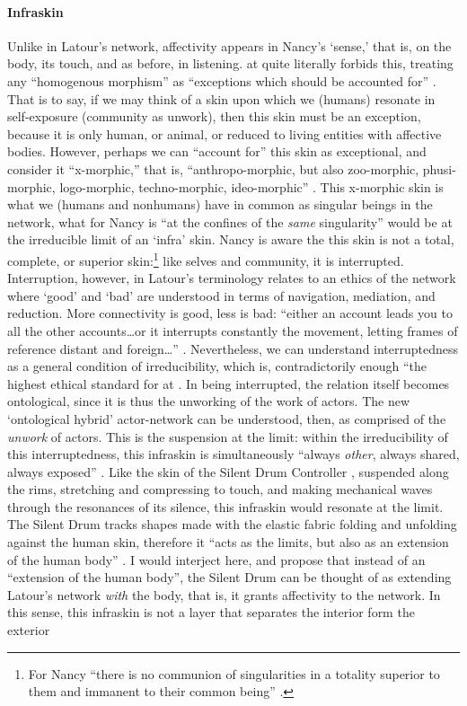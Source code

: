 \paragraph{Infraskin}
Unlike in Latour's network, affectivity appears in Nancy's `sense,' that is, on the body, its touch, and as before, in listening. \gls{at} quite literally forbids this, treating any ``homogenous morphism'' as ``exceptions which should be accounted for'' \parencite[16]{Lat90:On}. That is to say, if we may think of a skin upon which we (humans) resonate in self-exposure (community as unwork), then this skin must be an exception, because it is only human, or animal, or reduced to living entities with affective bodies. However, perhaps we can ``account for'' this skin as exceptional, and consider it ``x-morphic,'' that is, ``anthropo-morphic, but also zoo-morphic, phusi-morphic, logo-morphic, techno-morphic, ideo-morphic'' \parencite[16]{Lat90:On}. This x-morphic skin is what we (humans and nonhumans) have in common as singular beings in the network, what for Nancy is ``at the confines of the \textit{same} singularity'' \parencite[28]{Nan91:The} would be at the irreducible limit of an `infra' skin. Nancy is aware the this skin is not a total, complete, or superior skin:\footnote{For Nancy ``there is no communion of singularities in a totality superior to them and immanent to their common being'' \parencite[28]{Nan91:The}.} like selves and community, it is interrupted. Interruption, however, in Latour's terminology relates to an ethics of the network where `good' and `bad' are understood in terms of navigation, mediation, and reduction. More connectivity is good, less is bad: ``either an account leads you to all the other accounts\dots or it interrupts constantly the movement, letting frames of reference distant and foreign\dots'' \parencite[13-14]{Lat90:On}. Nevertheless, we can understand interruptedness as a general condition of irreducibility, which is, contradictorily enough ``the highest ethical standard for \gls{at} \parencite[14]{Lat90:On}. In being interrupted, the relation itself becomes ontological, since it is thus the unworking of the work of actors. The new `ontological hybrid' actor-network can be understood, then, as comprised of the \textit{unwork} of actors. This is the suspension at the limit: within the irreducibility of this interruptedness, this infraskin is simultaneously ``always \textit{other}, always shared, always exposed'' \parencite[28]{Nan91:The}. Like the skin of the Silent Drum Controller , suspended along the rims, stretching and compressing to touch, and making mechanical waves through the resonances of its silence, this infraskin would resonate at the limit. The Silent Drum tracks shapes made with the elastic fabric folding and unfolding against the human skin, therefore it ``acts as the limits, but also as an extension of the human body'' \parencite[2]{DBLP:conf/icmc/OliverJ08}. I would interject here, and propose that instead of an ``extension of the human body'', the Silent Drum can be thought of as extending Latour's network \textit{with} the body, that is, it grants affectivity to the network. In this sense, this infraskin is not a layer that separates the interior form the exterior 